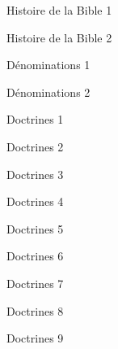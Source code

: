 \documentclass[11pt]{book}
\begin{document}
\clearpage
{}\clearpage
\makeatletter
    \def\@oddhead{{\small{\hfil\thepage\hfil}}}
    \def\@evenhead{{\small{\hfil\thepage\hfil}}}\clearpage
    \makeatother
        \small{\par\clearpage}\markboth{}{}
    \makeatletter
    \def\@oddhead{\hfil\thepage\hfil}
    \def\@evenhead{\hfil}
\makeatother
\clearpage
\begin{center}Histoire de la Bible 1\end{center}\clearpage
\begin{center}Histoire de la Bible 2\end{center}\clearpage
{}\clearpage
\begin{center}Dénominations 1\end{center}\clearpage
\begin{center}Dénominations 2\end{center}\clearpage
{}\clearpage
\begin{center}Doctrines 1\end{center}\clearpage
\begin{center}Doctrines 2\end{center}\clearpage
\begin{center}Doctrines 3\end{center}\clearpage
\begin{center}Doctrines 4\end{center}\clearpage
\begin{center}Doctrines 5\end{center}\clearpage
\begin{center}Doctrines 6\end{center}\clearpage
\begin{center}Doctrines 7\end{center}\clearpage
\begin{center}Doctrines 8\end{center}\clearpage
\begin{center}Doctrines 9\end{center}\clearpage
\end{document}

